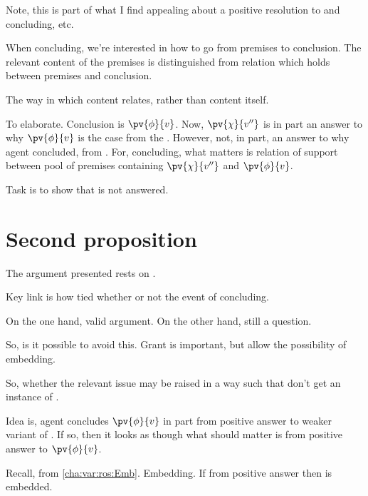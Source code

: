 \begin{note}[Aside]
  Note, this is part of what I find appealing about a positive resolution to \issueConstraint{} and concluding, etc.

  When concluding, we're interested in how to go from premises to conclusion.
  The relevant content of the premises is distinguished from relation which holds between premises and conclusion.

  The way in which content relates, rather than content itself.

  To elaborate.
  Conclusion is \(\pv{\phi}{v}\).
  Now, \(\pv{\chi}{v''}\) is in part an answer to why \(\pv{\phi}{v}\) is the case from the \agpe{}.
  However, not, in part, an answer to why agent concluded, from \agpe{}.
  For, concluding, what matters is relation of support between pool of premises containing \(\pv{\chi}{v''}\) and \(\pv{\phi}{v}\).
\end{note}

\begin{note}
  Task is to show that \qzS{} is not answered.
\end{note}

\section{Second proposition}
\label{sec:flexible-argument}

\begin{note}
  The argument presented rests on \qzS{}.

  Key link is how \qzS{} tied whether or not \fc{} the event of concluding.

  On the one hand, valid argument.
  On the other hand, still a question.

  So, is it possible to avoid this.
  Grant \fc{} is important, but allow the possibility of embedding.

  So, whether the relevant issue may be raised in a way such that don't get an instance of \qzS{}.

  Idea is, agent concludes \(\pv{\phi}{v}\) in part from positive answer to weaker variant of \qzS{}.
  If so, then it looks as though what should matter is \support{} from positive answer to \(\pv{\phi}{v}\).

  Recall, from \autoref{cha:var:ros:Emb}.
  Embedding.
  If \support{} from positive answer then \support{} is embedded.
\end{note}

